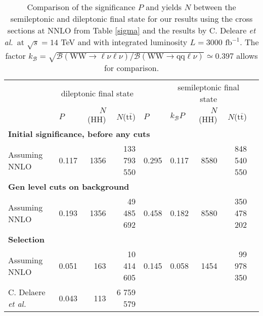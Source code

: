 \documentclass[10pt,a4paper]{article}
\newcommand{\level}[1]{ \multicolumn{5}{l}{\hspace{-1em}\textbf{#1}}}
\newcommand{\T}{\rule{0pt}{2.9ex}}       %
\renewcommand{\tt}{$\text{t}\bar{\text{t}}$}
\newcommand{\lnu}{$\ell\nu$}
\newcommand{\sAN}{$\sigma_1$}
\newcommand{\BR}{\mathcal{B}}
\newcommand{\etal}{\emph{et al.}}
\begin{document}
\begin{table}[t]
	\centering
	\caption{Comparison of the significance $P$ and yields $N$ between the semileptonic and dileptonic final state for our results using the cross sections at NNLO from Table \ref{sigma} and the results by C. Deleare \etal\ at $\sqrt{s}=14$ TeV and with integrated luminosity $L = 3000 \text{ fb}^{-1}$. The factor $k_{\BR}=\sqrt{\BR(\text{WW}\rightarrow\text{\lnu\lnu})/\BR(\text{WW}\rightarrow\text{qq\lnu})} \simeq 0.397$ allows for comparison.} \vspace{5pt}  %
	\label{comparison}
	\begin{tabular}{@{\quad}llrrllrrr@{}}
	
	\toprule
	& \multicolumn{3}{c}{dileptonic final state} && \multicolumn{3}{c}{semileptonic final state} \\
	\cmidrule(r){2-4} \cmidrule(r){5-8}
	                       &  $P$  & $N$(HH) &  $N$(\tt)  & $P$ & $k_{\BR}P$ & $N$(HH) &   $N$(\tt)  \\
	\midrule
	\level{Initial significance, before any cuts} \T\\
	Assuming NNLO          & 0.117 &   1356  & 133 793 550 & 0.295 & 0.117 &   8580  & 848 540 550  \\
	\level{Gen level cuts on background} \T\\
	Assuming NNLO          & 0.193 &   1356  &  49 485 692 & 0.458 & 0.182 &   8580  & 350 478 202  \\
	\level{Selection} \T\\
 	Assuming NNLO          & 0.051 &    163  &  10 414 605 & 0.145 & 0.058 &   1454  &  99 978 350  \\
	C. Delaere \etal       & 0.043 &    113  &   6 759 579 &       &       &         &              \\

\end{tabular}
\end{table}
\end{document}
